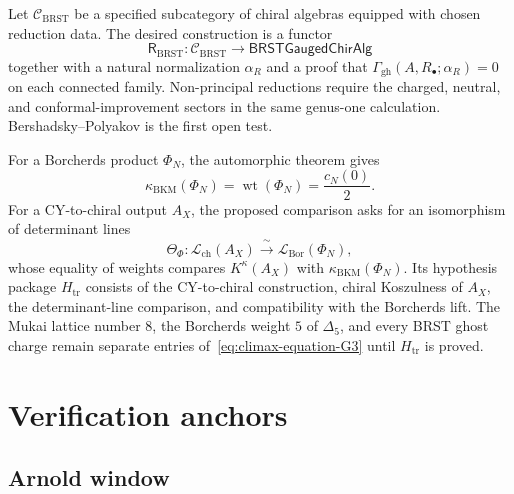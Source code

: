 \begin{conjecture}
\label{conj:climax-universal-brst-platonic}
\ClaimStatusConjectured
Let \(\mathcal C_{\mathrm{BRST}}\) be a specified subcategory of chiral
algebras equipped with chosen reduction data.  The desired
construction is a functor
\[
 \mathsf R_{\mathrm{BRST}}\colon
 \mathcal C_{\mathrm{BRST}}\longrightarrow
 \mathsf{BRSTGaugedChirAlg}
\]
together with a natural normalization
\(\alpha_R\) and a proof that
\(\Gamma_{\mathrm{gh}}(A,R_\bullet;\alpha_R)=0\) on each connected
family.  Non-principal reductions require the charged, neutral, and
conformal-improvement sectors in the same genus-one calculation.
Bershadsky--Polyakov is the first open test.
\end{conjecture}

\begin{conjecture}
\label{conj:climax-universal-trace-identity-platonic}
\ClaimStatusConjectured
For a Borcherds product \(\Phi_N\), the automorphic theorem gives
\[
 \kappa_{\mathrm{BKM}}(\Phi_N)
 =\operatorname{wt}(\Phi_N)
 =\frac{c_N(0)}2.
\]
For a CY-to-chiral output \(A_X\), the proposed comparison asks for an
isomorphism of determinant lines
\begin{equation}
\label{eq:trace-identity-platonic}
 \Theta_{\Phi}\colon
 \mathcal L_{\mathrm{ch}}(A_X)
 \xrightarrow{\ \sim\ }
 \mathcal L_{\mathrm{Bor}}(\Phi_N),
\end{equation}
whose equality of weights compares \(K^\kappa(A_X)\) with
\(\kappa_{\mathrm{BKM}}(\Phi_N)\).  Its hypothesis package
\(H_{\mathrm{tr}}\) consists of the CY-to-chiral construction,
chiral Koszulness of \(A_X\), the determinant-line comparison, and
compatibility with the Borcherds lift.  The Mukai lattice number \(8\),
the Borcherds weight \(5\) of \(\Delta_5\), and every BRST ghost charge
remain separate entries of~\eqref{eq:climax-equation-G3} until
\(H_{\mathrm{tr}}\) is proved.
\end{conjecture}

\section{Verification anchors}
\label{sec:climax-platonic-iv}

\subsection{Arnold window}
\label{ssec:climax-platonic-iv-G2}

